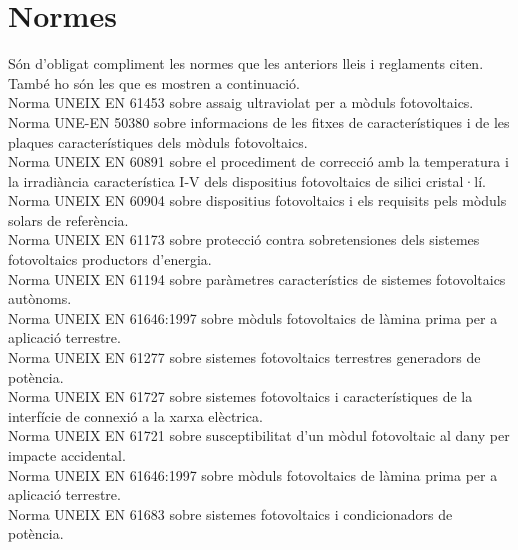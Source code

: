 \section{Normes}
Són d'obligat compliment les normes que les anteriors lleis i reglaments citen. També ho són les que es mostren a continuació.\\
\newline Norma UNEIX EN 61453 sobre assaig ultraviolat per a mòduls fotovoltaics.\\
\newline Norma UNE-EN 50380 sobre informacions de les fitxes de característiques i de les plaques característiques dels mòduls fotovoltaics.\\
\newline Norma UNEIX EN 60891 sobre el procediment de correcció amb la temperatura i la irradiància característica I-V dels dispositius fotovoltaics de silici cristal·lí.\\
\newline Norma UNEIX EN 60904 sobre dispositius fotovoltaics i els requisits pels mòduls solars de referència.\\
\newline Norma UNEIX EN 61173 sobre protecció contra sobretensiones dels sistemes fotovoltaics productors d'energia. \\
\newline Norma UNEIX EN 61194 sobre paràmetres característics de sistemes fotovoltaics autònoms.\\
\newline Norma UNEIX EN 61646:1997 sobre mòduls fotovoltaics de làmina prima per a aplicació terrestre.\\
\newline Norma UNEIX EN 61277 sobre sistemes fotovoltaics terrestres generadors de potència.\\
\newline Norma UNEIX EN 61727 sobre sistemes fotovoltaics i característiques de la interfície de connexió a la xarxa elèctrica.\\
\newline Norma UNEIX EN 61721 sobre susceptibilitat d'un mòdul fotovoltaic al dany per impacte accidental.\\
\newline Norma UNEIX EN 61646:1997 sobre mòduls fotovoltaics de làmina prima per a aplicació terrestre.\\
\newline Norma UNEIX EN 61683 sobre sistemes fotovoltaics i condicionadors de potència.\\
